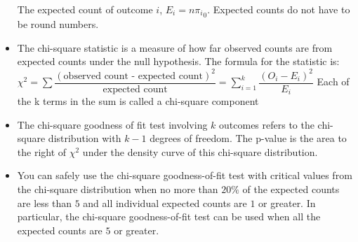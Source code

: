 \documentclass[twoside]{article}
\newcommand{\0}{\mathbf{0}}
\begin{document}
\begin{itemize}
\subitem The expected count of outcome $i$, $E_i=n{\pi_i}_0$. Expected counts do not have to be round numbers.
\item The chi-square statistic is a measure of how far observed counts are from expected counts under the null hypothesis. The formula for the statistic is:
\subitem $\chi^2=\sum{\dfrac{(\textrm{observed count - expected count})^2}{\textrm{expected count}}}=\sum_{i=1}^k{\dfrac{(O_i-E_i)^2}{E_i}}$
\subitem Each of the k terms in the sum is called a chi-square component
\item The chi-square goodness of fit test involving $k$ outcomes refers to the chi-square distribution with $k - 1$ degrees of freedom. The p-value is the area to the right of $\chi^2$ under the density curve of this chi-square distribution.
\item You can safely use the chi-square goodness-of-fit test with critical values from the chi-square distribution when no more than $20\%$ of the expected counts are less than $5$ and all individual expected counts are $1$ or greater. In particular, the chi-square goodness-of-fit test can be used when all the expected counts are $5$ or greater.

\end{itemize}
\end{document}
